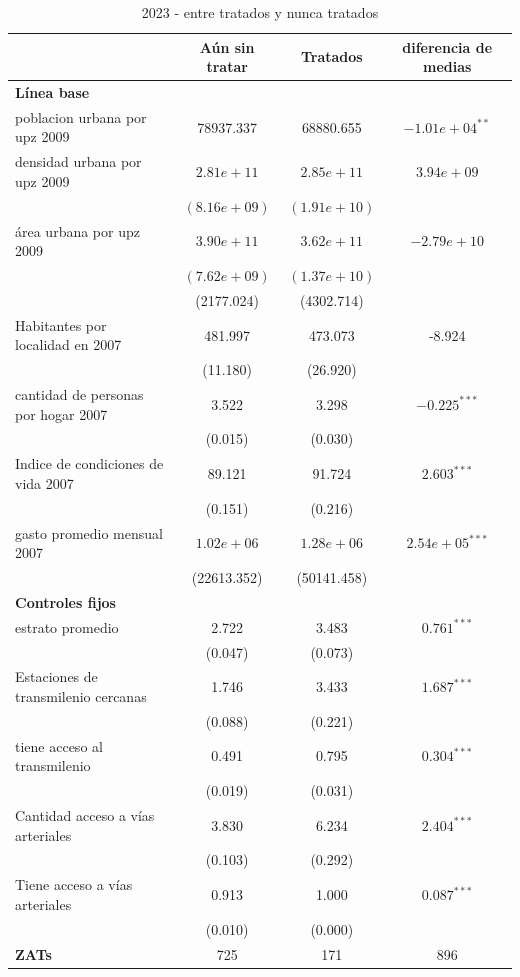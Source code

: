 \documentclass{article}
\begin{document}
\begin{table} [H]
  \centering
  \caption{2023 - entre tratados y nunca tratados}
  \label{tab:comparacion_tratamientos}
  \begin{tabular}{l c c c}
    \toprule
    & \textbf{Aún sin tratar} & \textbf{Tratados} & \textbf{diferencia de medias} \\
    \midrule
    \multicolumn{4}{l}{\textbf{Línea base}} \\
    \midrule
    poblacion urbana por upz 2009 & 78937.337 & 68880.655 & $-1.01e+04^{**}$ \\
    densidad urbana por upz 2009 & $2.81e+11$ & $2.85e+11$ & $3.94e+09$ \\
    & $(8.16e+09)$ & $(1.91e+10)$ & \\
    área urbana por upz 2009 & $3.90e+11$ & $3.62e+11$ & $-2.79e+10$ \\
    & $(7.62e+09)$ & $(1.37e+10)$ & \\
    & (2177.024) & (4302.714) & \\
    Habitantes por localidad en 2007 & 481.997 & 473.073 & -8.924 \\
    & (11.180) & (26.920) & \\
    cantidad de personas por hogar 2007 & 3.522 & 3.298 & $-0.225^{***}$ \\
    & (0.015) & (0.030) & \\
    Indice de condiciones de vida 2007 & 89.121 & 91.724 & $2.603^{***}$ \\
    & (0.151) & (0.216) & \\
    gasto promedio mensual 2007 & $1.02e+06$ & $1.28e+06$ & $2.54e+05^{***}$ \\
    & (22613.352) & (50141.458) & \\
    \midrule
    \multicolumn{4}{l}{\textbf{Controles fijos}} \\
    \midrule
        estrato promedio & 2.722 & 3.483 & $0.761^{***}$ \\
    & (0.047) & (0.073) & \\
     Estaciones de transmilenio cercanas & 1.746 & 3.433 & $1.687^{***}$ \\
    & (0.088) & (0.221) & \\
    tiene acceso al transmilenio & 0.491 & 0.795 & $0.304^{***}$ \\
    & (0.019) & (0.031) & \\
    Cantidad acceso a vías arteriales & 3.830 & 6.234 & $2.404^{***}$ \\
    & (0.103) & (0.292) & \\
    Tiene acceso a vías arteriales & 0.913 & 1.000 & $0.087^{***}$ \\
    & (0.010) & (0.000) & \\
    \midrule
    \midrule
    \textbf{ZATs} & 725 & 171 & 896 \\
    \bottomrule
  \end{tabular}
\end{table}
\end{document}

